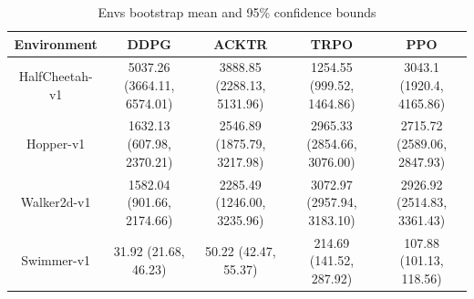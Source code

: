 \begin{table}[H]
    \centering
    \scriptsize{\begin{tabular}{|c|c|c|c|c|}
    \hline
         Environment&DDPG&ACKTR&TRPO&PPO  \\
         \hline
         HalfCheetah-v1&5037.26 (3664.11, 6574.01)&3888.85 (2288.13, 5131.96)&1254.55 (999.52, 1464.86)& 3043.1 (1920.4, 4165.86)\\
         \hline
         Hopper-v1&1632.13 (607.98, 2370.21)&2546.89 (1875.79, 3217.98)&2965.33 (2854.66, 3076.00)&2715.72 (2589.06, 2847.93)\\
         Walker2d-v1&1582.04 (901.66, 2174.66)&2285.49 (1246.00, 3235.96)&3072.97 (2957.94, 3183.10)&2926.92 (2514.83, 3361.43)\\
         \hline
         Swimmer-v1&31.92 (21.68, 46.23)&50.22 (42.47, 55.37)&214.69 (141.52, 287.92)&107.88 (101.13, 118.56)\\
         \hline
    \end{tabular}}
    \caption{Envs bootstrap mean and 95\% confidence bounds}
    \label{tab:bootstrap}
\end{table}


